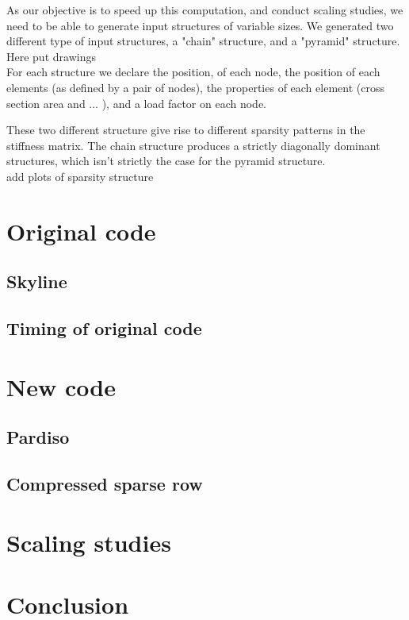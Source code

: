 \documentclass[11pt]{article}
\begin{document}
As our objective is to speed up this computation, and conduct scaling studies, we need to be able to generate input structures of variable sizes.
We generated two different type of input structures, a "chain" structure, and a "pyramid" structure.
\\
Here put drawings
\\
For each structure we declare the position, of each node, the position of each elements (as defined by a pair of nodes), the properties of each element (cross section area and ... ), and a load factor on each node.

These two different structure give rise to different sparsity patterns in the stiffness matrix. The chain structure produces a strictly diagonally dominant structures, which isn't strictly the case for the pyramid structure.
\\
add plots of sparsity structure

\section{Original code}

\subsection{Skyline}

\subsection{Timing of original code}

\section{New code}

\subsection{Pardiso}

\subsection{Compressed sparse row}

\section{Scaling studies}

\section{Conclusion}
\end{document}
